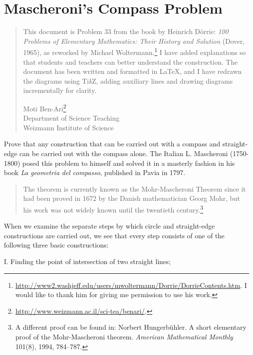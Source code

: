 \chapter{Mascheroni's Compass Problem}\label{c.compass-only}


\begin{quote}
This document is Problem $33$ from the book by Heinrich D\"{o}rrie: \textit{100 Problems of Elementary Mathematics: Their History and Solution} (Dover, 1965), as reworked by Michael Woltermann.\footnote{\url{http://www2.washjeff.edu/users/mwoltermann/Dorrie/DorrieContents.htm}. I would like to thank him for giving me permission to use his work.} I have added explanations so that students and teachers can better understand the construction. The document has been written and formatted in \LaTeX{}, and I have redrawn the diagrams using Ti\textit{k}Z, adding auxiliary lines and  drawing diagrams incrementally for clarity.

Moti Ben-Ari\footnote{\url{http://www.weizmann.ac.il/sci-tea/benari/}.}\\
Department of Science Teaching\\
Weizmann Institute of Science
\end{quote}

\bigskip


Prove that any construction that can be carried out with a compass and straight-edge can be carried out with the compass alone. The Italian L. Mascheroni (1750-1800) posed this problem to himself and solved it in a masterly fashion in his book \textit{La geometria del compasso}, published in Pavia in 1797.

\begin{quote}
The theorem is currently known as the Mohr-Mascheroni Theorem since it had been proved in 1672 by the Danish mathematician Georg Mohr, but his work was not widely known until the twentieth century.\footnote{A different proof can be found in: Norbert Hungerb\"{u}hler. A short elementary proof of the Mohr-Mascheroni theorem. \textit{American Mathematical Monthly} 101(8), 1994, 784--787.}
\end{quote}

When we examine the separate steps by which circle and straight-edge constructions are carried out, we see that every step consists of one of the following three basic constructions:

I. Finding the point of intersection of two straight lines;

